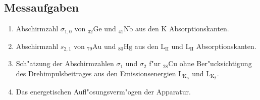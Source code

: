	\subsection{Messaufgaben}
		\begin{enumerate}
			\item{Abschirmzahl $\sigma_{1,0}$ von ${}_{32} \mathrm{Ge}$ und ${}_{41} \mathrm{Nb}$ aus den K Absorptionskanten.}
			\label{aufg:1}
			\item{Abschirmzahl $s_{2,1}$ von ${}_{79} \mathrm{Au}$ und ${}_{80} \mathrm{Hg}$ aus den $\mathrm{L}_\mathrm{II}$ und $\mathrm{L}_\mathrm{II}$ Absorptionskanten.}
			\label{aufg:2}
			\item{Sch"atzung der Abschirmzahlen $\sigma_{1}$ und $\sigma_{2}$ f"ur ${}_{28} \mathrm{Cu}$ ohne Ber"ucksichtigung des Drehimpulsbeitrages aus den Emissionsenergien $\mathrm{L}_\mathrm{K_\mathrm{\alpha}}$ und $\mathrm{L}_\mathrm{K_\mathrm{\beta}}$.}
			\label{aufg:3}
			\item{Das energetischen Aufl"osungsverm"ogen der Apparatur.}
			\label{aufg:4}
		\end{enumerate}

